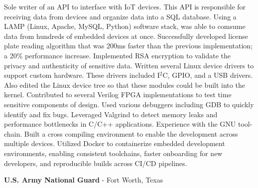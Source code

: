 \documentclass[letterpaper,MMMyyyy,nonstopmode]{simpleresumecv}
\begin{document}
\begin{Body}
    \begin{Detail}
        \BulletItem
        Sole writer of an API to interface with IoT devices. This API is responsible for receiving data from devices and organize data into a SQL database. Using a LAMP (Linux, Apache, MySQL, Python) software stack, was able to comsume data from hundreds of embedded devices at once.
        \vspace{1mm} %
        \BulletItem
        Successfully developed license plate reading algorithm that was 200ms faster than the previous implementation; a 20\% performance increase.
        \vspace{1mm} %
        \BulletItem
        Implemented RSA encryption to validate the privacy and authenticity of sensitive data.
        \BulletItem
        Written several Linux device drivers to support custom hardware. These drivers included I$^2$C, GPIO, and a USB drivers. Also edited the Linux device tree so that these modules could be built into the kernel.
        \vspace{1mm} %
        \BulletItem
        Contributed to several Verilog FPGA implementations to test time sensitive components of design.
        \vspace{1mm} %
        \BulletItem
        Used various debuggers including GDB to quickly identify and fix bugs. Leveraged Valgrind to detect memory leaks and performance bottlenecks in C/C++ applications.
        \vspace{1mm} %
        \BulletItem
        Experience with the GNU tool-chain. Built a cross compiling environment to enable the development across multiple devices.
        \vspace{1mm} %
        \BulletItem
        Utilized Docker to containerize embedded development environments, enabling consistent toolchains, faster onboarding for new developers, and reproducible builds across CI/CD pipelines.
        \vspace{1mm} %
    \end{Detail}

    \vspace{3mm} %
    \pagebreak
    {\textbf{U.S. Army National Guard}}
    - Fort Worth, Texas


\end{Body}
\end{document}
